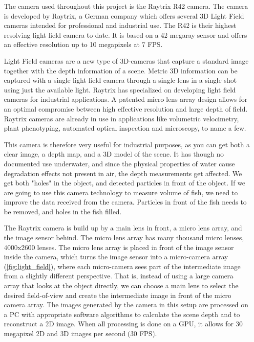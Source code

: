 The camera used throughout this project is the Raytrix R42 camera. The camera is developed by Raytrix, a German company which offers several 3D Light Field cameras intended for professional and industrial use. The R42 is their highest resolving light field camera to date. It is based on a 42 megaray sensor and offers an effective resolution up to 10 megapixels at 7 FPS. \cite{website:raytrix_r42}

Light Field cameras are a new type of 3D-cameras that capture a standard image together with the depth information of a scene. Metric 3D information can be captured with a single light field camera through a single lens in a single shot using just the available light. Raytrix has specialized on developing light field cameras for industrial applications. A patented micro lens array design allows for an optimal compromise between high effective resolution and large depth of field. Raytrix cameras are already in use in applications like volumetric velocimetry, plant phenotyping, automated optical inspection and microscopy, to name a few. \cite{website:raytrix_main}

This camera is therefore very useful for industrial purposes, as you can get both a clear image, a depth map, and a 3D model of the scene. It has though no documented use underwater, and since the physical properties of water cause degradation effects not present in air, the depth measurements get affected. We get both "holes" in the object, and detected particles in front of the object. If we are going to use this camera technology to measure volume of fish, we need to improve the data received from the camera. Particles in front of the fish needs to be removed, and holes in the fish filled.

The Raytrix camera is build up by a main lens in front, a micro lens array, and the image sensor behind. The micro lens array has many thousand micro lenses, 4000x2600 lenses. The micro lens array is placed in front of the image sensor inside the camera, which turns the image sensor into a micro-camera array (\ref{fig:light_field}), where each micro-camera sees part of the intermediate image from a slightly different perspective. That is, instead of using a large camera array that looks at the object directly, we can choose a main lens to select the desired field-of-view and create the intermediate image in front of the micro camera array. The images generated by the camera in this setup are processed on a PC with appropriate software algorithms to calculate the scene depth and to reconstruct a 2D image. When all processing is done on a GPU, it allows for 30 megapixel 2D and 3D images per second (30 FPS). \cite{website:raytrix_technology}

